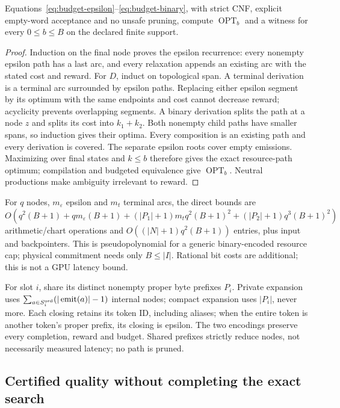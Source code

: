 \begin{theorem}
Equations~\ref{eq:budget-epsilon}--\ref{eq:budget-binary}, with strict CNF, explicit empty-word acceptance and no unsafe pruning, compute $\operatorname{OPT}_b$ and a witness for every $0\leq b\leq B$ on the declared finite support.
\label{thm:budget-dp}
\end{theorem}
\begin{proof}
Induction on the final node proves the epsilon recurrence: every nonempty epsilon path has a last arc, and every relaxation appends an existing arc with the stated cost and reward. For $D$, induct on topological span. A terminal derivation is a terminal arc surrounded by epsilon paths. Replacing either epsilon segment by its optimum with the same endpoints and cost cannot decrease reward; acyclicity prevents overlapping segments. A binary derivation splits the path at a node $z$ and splits its cost into $k_1+k_2$. Both nonempty child paths have smaller spans, so induction gives their optima. Every composition is an existing path and every derivation is covered. The separate epsilon roots cover empty emissions. Maximizing over final states and $k\leq b$ therefore gives the exact resource-path optimum; compilation and budgeted equivalence give $\operatorname{OPT}_b$. Neutral productions make ambiguity irrelevant to reward.
\end{proof}

For $q$ nodes, $m_\varepsilon$ epsilon and $m_t$ terminal arcs, the direct bounds are $O(q^2(B+1)+qm_\varepsilon(B+1)+(|P_1|+1)m_tq^2(B+1)^2+(|P_2|+1)q^3(B+1)^2)$ arithmetic/chart operations and $O((|N|+1)q^2(B+1))$ entries, plus input and backpointers. This is pseudopolynomial for a generic binary-encoded resource cap; physical commitment needs only $B\leq|I|$. Rational bit costs are additional; this is not a GPU latency bound.


For slot $i$, share its distinct nonempty proper byte prefixes $P_i$. Private expansion uses $\sum_{a\in S_i^{\rm ord}}(|\operatorname{emit}(a)|-1)$ internal nodes; compact expansion uses $|P_i|$, never more. Each closing retains its token ID, including aliases; when the entire token is another token's proper prefix, its closing is epsilon. The two encodings preserve every completion, reward and budget. Shared prefixes strictly reduce nodes, not necessarily measured latency; no path is pruned.


\subsection{Certified quality without completing the exact search}

